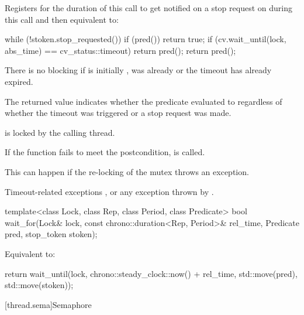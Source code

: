 \begin{itemdescr}
\pnum
\effects
Registers for the duration of this call 
to get notified on a stop request on 
during this call and then equivalent to:
\begin{codeblock}
while (!stoken.stop_requested()) {
  if (pred())
    return true;
  if (cv.wait_until(lock, abs_time) == cv_status::timeout)
    return pred();
}
return pred();
\end{codeblock}

\pnum
\begin{note}
There is no blocking if  is initially ,
 was already 
or the timeout has already expired.
\end{note}

\pnum
\begin{note}
The returned value indicates whether the predicate evaluated to 
regardless of whether the timeout was triggered or a stop request was made.
\end{note}

\pnum
\ensures
{} is locked by the calling thread.

\pnum
\remarks
If the function fails to meet the postcondition,
 is called.
\begin{note}
This can happen if the re-locking of the mutex throws an exception.
\end{note}

\pnum
\throws
Timeout-related exceptions ,
or any exception thrown by .
\end{itemdescr}

\begin{itemdecl}
template<class Lock, class Rep, class Period, class Predicate>
  bool wait_for(Lock& lock, const chrono::duration<Rep, Period>& rel_time,
                Predicate pred, stop_token stoken);
\end{itemdecl}

\begin{itemdescr}
\pnum
\effects
Equivalent to:
\begin{codeblock}
return wait_until(lock, chrono::steady_clock::now() + rel_time, std::move(pred),
                  std::move(stoken));
\end{codeblock}
\end{itemdescr}

[thread.sema]{Semaphore}


